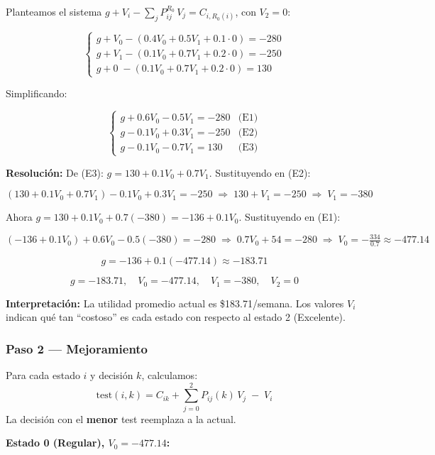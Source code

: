 \documentclass[12pt,a4paper]{article}
\begin{document}
Planteamos el sistema $g + V_i - \sum_{j} P_{ij}^{R_0}\, V_j = C_{i,R_0(i)}$, con $V_2 = 0$:

\[
\begin{cases}
g + V_0 - (0.4V_0 + 0.5V_1 + 0.1\cdot 0) = -280 \\
g + V_1 - (0.1V_0 + 0.7V_1 + 0.2\cdot 0) = -250 \\
g + 0 \; - (0.1V_0 + 0.7V_1 + 0.2\cdot 0) = 130
\end{cases}
\]

Simplificando:

\[
\boxed{\begin{cases}
g + 0.6V_0 - 0.5V_1 = -280 & \text{(E1)}\\[4pt]
g - 0.1V_0 + 0.3V_1 = -250 & \text{(E2)}\\[4pt]
g - 0.1V_0 - 0.7V_1 = 130  & \text{(E3)}
\end{cases}}
\]

\textbf{Resolución:} De (E3): $g = 130 + 0.1V_0 + 0.7V_1$. Sustituyendo en (E2):

\[
(130 + 0.1V_0 + 0.7V_1) - 0.1V_0 + 0.3V_1 = -250
\;\Longrightarrow\; 130 + V_1 = -250
\;\Longrightarrow\; \boxed{V_1 = -380}
\]

Ahora $g = 130 + 0.1V_0 + 0.7(-380) = -136 + 0.1V_0$. Sustituyendo en (E1):

\[
(-136 + 0.1V_0) + 0.6V_0 - 0.5(-380) = -280
\;\Longrightarrow\; 0.7V_0 + 54 = -280
\;\Longrightarrow\; \boxed{V_0 = -\tfrac{334}{0.7} \approx -477.14}
\]

\[
g = -136 + 0.1(-477.14) \approx \boxed{-183.71}
\]

\[
\boxed{ \boxed{ g = -183.71,\quad V_0 = -477.14,\quad V_1 = -380,\quad V_2 = 0 } }
\]

\textbf{Interpretación:} La utilidad promedio actual es \$183.71/semana. Los valores $V_i$ indican qué tan ``costoso'' es cada estado con respecto al estado 2 (Excelente).

\subsubsection*{Paso 2 --- Mejoramiento}

Para cada estado $i$ y decisión $k$, calculamos:
\[ \text{test}(i,k) = C_{ik} + \sum_{j=0}^{2} P_{ij}(k)\, V_j \;-\; V_i \]
La decisión con el \textbf{menor} test reemplaza a la actual.

\vspace{0.3cm}
\textbf{Estado 0 (Regular), $V_0 = -477.14$:}
\end{document}
